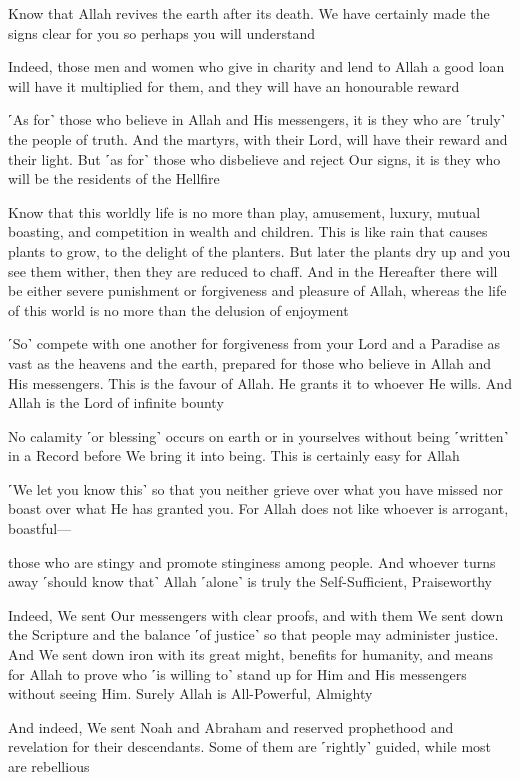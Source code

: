 Know that Allah revives the earth after its death. We have certainly made the signs clear for you so perhaps you will understand

Indeed, those men and women who give in charity and lend to Allah a good loan will have it multiplied for them, and they will have an honourable reward

˹As for˺ those who believe in Allah and His messengers, it is they who are ˹truly˺ the people of truth. And the martyrs, with their Lord, will have their reward and their light. But ˹as for˺ those who disbelieve and reject Our signs, it is they who will be the residents of the Hellfire

Know that this worldly life is no more than play, amusement, luxury, mutual boasting, and competition in wealth and children. This is like rain that causes plants to grow, to the delight of the planters. But later the plants dry up and you see them wither, then they are reduced to chaff. And in the Hereafter there will be either severe punishment or forgiveness and pleasure of Allah, whereas the life of this world is no more than the delusion of enjoyment

˹So˺ compete with one another for forgiveness from your Lord and a Paradise as vast as the heavens and the earth, prepared for those who believe in Allah and His messengers. This is the favour of Allah. He grants it to whoever He wills. And Allah is the Lord of infinite bounty

No calamity ˹or blessing˺ occurs on earth or in yourselves without being ˹written˺ in a Record before We bring it into being. This is certainly easy for Allah

˹We let you know this˺ so that you neither grieve over what you have missed nor boast over what He has granted you. For Allah does not like whoever is arrogant, boastful—

those who are stingy and promote stinginess among people. And whoever turns away ˹should know that˺ Allah ˹alone˺ is truly the Self-Sufficient, Praiseworthy

Indeed, We sent Our messengers with clear proofs, and with them We sent down the Scripture and the balance ˹of justice˺ so that people may administer justice. And We sent down iron with its great might, benefits for humanity, and means for Allah to prove who ˹is willing to˺ stand up for Him and His messengers without seeing Him. Surely Allah is All-Powerful, Almighty

And indeed, We sent Noah and Abraham and reserved prophethood and revelation for their descendants. Some of them are ˹rightly˺ guided, while most are rebellious

